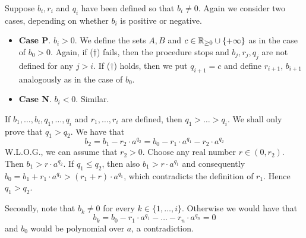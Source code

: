 \documentclass[11pt]{article}
\begin{document}
\begin{center}
\end{center}

Suppose  \(b_i,r_i\) and \(q_i\) have been defined so that \(b_i\neq 0\). Again we consider two cases,
depending on whether \(b_i\) is positive or negative.

\begin{itemize}
\item \textbf{Case P}. \(b_i>0\). We define the sets \(A,B\) and \(c\in\mathbb{R}_{\ge 0}\cup\{+\infty\}\) as in the case of \(b_0>0\).
Again, if (\(\dagger\)) fails, then the procedure stops and \(b_j,r_j,q_j\) are not defined for
any \(j>i\). If (\(\dagger\)) holds, then we put \(q_{i+1}=c\) and define \(r_{i+1}\), \(b_{i+1}\)
analogously as in the case of \(b_0\).

\item \textbf{Case N}. \(b_i<0\). Similar.
\end{itemize}

If \(b_1,\dots,b_i,q_1,\dots,q_i\) and \(r_1,\dots,r_i\) are defined, then \(q_1>\dots>q_i\). We shall only prove
that \(q_1>q_2\). We have that
\begin{equation*}
b_2=b_1-r_2\cdot a^{q_2}=b_0-r_1\cdot a^{q_1}-r_2\cdot a^{q_2}
\end{equation*}
W.L.O.G., we can assume that \(r_2>0\). Choose any real number \(r\in(0,r_2)\).
Then \(b_1>r\cdot a^{q_2}\). If \(q_1\le q_2\), then also \(b_1>r\cdot a^{q_1}\) and
consequently \(b_0=b_1+r_1\cdot a^{q_1}>(r_1+r)\cdot a^{q_1}\), which contradicts the definition of \(r_1\).
Hence \(q_1>q_2\).

Secondly, note that \(b_k\neq 0\) for every \(k\in\{1,\dots,i\}\). Otherwise we would have that
\begin{equation*}
b_k=b_0-r_1\cdot a^{q_1}-\dots-r_n\cdot a^{q_n}=0
\end{equation*}
and \(b_0\) would be polynomial over \(a\), a contradiction.
\end{document}
